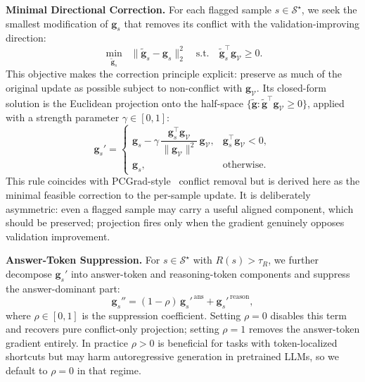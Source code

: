 \textbf{Minimal Directional Correction.} For each flagged sample $s \in \mathcal{S}^\star$, we seek the smallest modification of $\mathbf{g}_s$ that removes its conflict with the validation-improving direction:
\begin{equation}
\label{eq:projection_objective}
    \min_{\widetilde{\mathbf{g}}_s} \;\;
    \|\widetilde{\mathbf{g}}_s - \mathbf{g}_s\|_2^2
    \quad \text{s.t.} \quad
    \widetilde{\mathbf{g}}_s^\top \mathbf{g}_{\mathcal{V}} \ge 0.
\end{equation}
This objective makes the correction principle explicit: preserve as much of the original update as possible subject to non-conflict with $\mathbf{g}_{\mathcal{V}}$. Its closed-form solution is the Euclidean projection onto the half-space $\{\widetilde{\mathbf{g}} : \widetilde{\mathbf{g}}^\top \mathbf{g}_{\mathcal{V}} \geq 0\}$, applied with a strength parameter $\gamma \in [0,1]$:
\begin{equation}
\label{eq:gradient_surgery}
    \mathbf{g}_s' =
    \begin{cases}
        \mathbf{g}_s - \gamma\,\dfrac{\mathbf{g}_s^\top \mathbf{g}_{\mathcal{V}}}{\|\mathbf{g}_{\mathcal{V}}\|^2}\,\mathbf{g}_{\mathcal{V}}, & \mathbf{g}_s^\top \mathbf{g}_{\mathcal{V}} < 0, \\[4pt]
        \mathbf{g}_s, & \text{otherwise.}
    \end{cases}
\end{equation}
This rule coincides with PCGrad-style~\cite{yu2020gradient} conflict removal but is derived here as the minimal feasible correction to the per-sample update. It is deliberately asymmetric: even a flagged sample may carry a useful aligned component, which should be preserved; projection fires only when the gradient genuinely opposes validation improvement.

\textbf{Answer-Token Suppression.} For $s \in \mathcal{S}^\star$ with $R(s) > \tau_R$, we further decompose $\mathbf{g}_s'$ into answer-token and reasoning-token components and suppress the answer-dominant part:
\begin{equation}
    \mathbf{g}_s'' = (1 - \rho)\,\mathbf{g}_s'^{\,\mathrm{ans}} + \mathbf{g}_s'^{\,\mathrm{reason}},
\end{equation}
where $\rho \in [0,1]$ is the suppression coefficient. Setting $\rho=0$ disables this term and recovers pure conflict-only projection; setting $\rho=1$ removes the answer-token gradient entirely. In practice $\rho>0$ is beneficial for tasks with token-localized shortcuts but may harm autoregressive generation in pretrained LLMs, so we default to $\rho=0$ in that regime.

